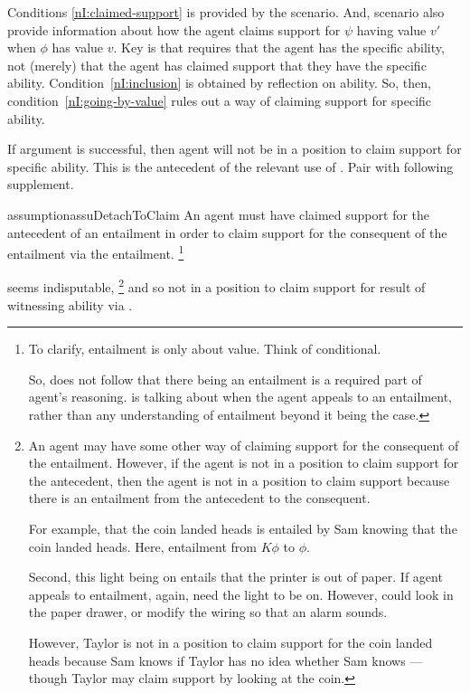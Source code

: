 \newpage

\begin{note}
  Conditions \ref{nI:claimed-support} is provided by the scenario.
  And, scenario also provide information about how the agent claims support for \(\psi\) having value \(v'\) when \(\phi\) has value \(v\).
  Key is that  requires that the agent has the specific ability, not (merely) that the agent has claimed support that they have the specific ability.
  Condition~\ref{nI:inclusion} is obtained by reflection on ability.
  So, then, condition~\ref{nI:going-by-value} rules out a way of claiming support for specific ability.
\end{note}

\begin{note}
  If argument is successful, then agent will not be in a position to claim support for specific ability.
  This is the antecedent of the relevant use of .
  Pair \nI{} with following supplement.

  \begin{restatable}[]{assumption}{assuDetachToClaim}\label{assu:detach-to-claim}
    An agent must have claimed support for the antecedent of an entailment in order to claim support for the consequent of the entailment via the entailment.\nolinebreak
    \footnote{To clarify, entailment is only about value.
      Think of conditional.

      So, does not follow that there being an entailment is a required part of agent's reasoning.
      \nIm{} is talking about when the agent appeals to an entailment, rather than any understanding of entailment beyond it being the case.
    }
  \end{restatable}
  \nIm{} seems indisputable,\nolinebreak
  \footnote{
    An agent may have some other way of claiming support for the consequent of the entailment.
    However, if the agent is not in a position to claim support for the antecedent, then the agent is not in a position to claim support because there is an entailment from the antecedent to the consequent.\nolinebreak

    For example, that the coin landed heads is entailed by Sam knowing that the coin landed heads.
    Here, entailment from \(K\phi\) to \(\phi\).

    Second, this light being on entails that the printer is out of paper.
    If agent appeals to entailment, again, need the light to be on.
    However, could look in the paper drawer, or modify the wiring so that an alarm sounds.

    However, Taylor is not in a position to claim support for the coin landed heads because Sam knows if Taylor has no idea whether Sam knows --- though Taylor may claim support by looking at the coin.
  }
  and so not in a position to claim support for result of witnessing ability via \AR{}.
\end{note}

